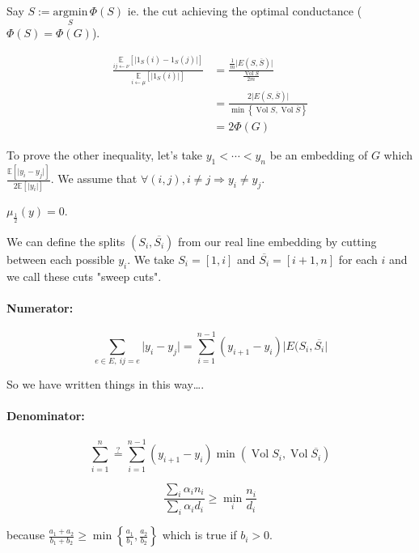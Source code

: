 \documentclass[12pt]{article}
\newcommand{\EE}{\mathbb{E}}
\newcommand{\set}[1]{\left\{ #1 \right\}}
\newcommand{\brackets}[1]{\left[ #1 \right]}
\newcommand{\argmin}{\text{argmin}}
\newcommand{\Ra}{\Rightarrow}
\newcommand{\la}{\leftarrow}
\newcommand{\esp}[2][]{\underset{#1}{\EE}\left[ #2 \right]}
\DeclareMathOperator{\vol}{Vol}
\begin{document}
\bigskip

Say $S:=\underset{S}{\argmin}\,\Phi(S)$ ie. the cut achieving the optimal conductance ($\Phi(S) = \Phi(G)$).

\[
    \begin{aligned}
        \frac{\esp[ij\la\nu]{\lvert1_S(i)-1_S(j)\rvert}}{\esp[i\la\mu]{\lvert 1_S(i)\rvert}} &= \frac{\frac{1}{m}\lvert E(S,\overline{S})\rvert}{\frac{\vol S}{2m}}\\
        &= \frac{2\lvert E(S,\overline{S}) \rvert}{\min\set{\vol S, \vol \overline{S}}}\\
        &= 2 \Phi(G)
    \end{aligned}
\]

\bigskip

To prove the other inequality, let's take $y_1 < \cdots < y_n$ be an embedding of $G$ which $\frac{\esp{\lvert y_i-y_j\rvert}}{2\esp{\lvert y_i \rvert}}$. We assume that $\forall (i,j), i\neq j \Ra y_i \neq y_j$.

$\mu_{\frac{1}{2}}(y) = 0$.


    We can define the splits $(S_i, \overline{S_i})$ from our real line embedding by cutting between each possible $y_i$. We take $S_i = \brackets{1,i}$ and $\overline{S_i} = \brackets{i+1,n}$ for each $i$ and we call these cuts "sweep cuts".

\paragraph{Numerator:}

\[
    \sum\limits_{e\in E,\ ij=e} \lvert y_i-y_j \rvert = \sum\limits_{i=1}^{n-1} (y_{i+1} - y_i) \lvert E(S_i, \overline{S_i} \rvert
\]

So we have written things in this way\dots.

\paragraph{Denominator:}


\[
    \sum\limits_{i=1}^n \overset{?}{=} \sum\limits_{i=1}^{n-1} (y_{i+1} - y_i) \min(\vol S_i, \vol \overline{S_i})
\]

\[
    \frac{\sum\limits_i \alpha_i n_i}{\sum\limits_i \alpha_i d_i} \geqslant \min\limits_i \frac{n_i}{d_i}
\]

because $\frac{a_1+a_2}{b_1+b_2} \geqslant \min\set{\frac{a_1}{b_1},\frac{a_2}{b_2}}$ which is true if $b_i > 0$.
\end{document}
